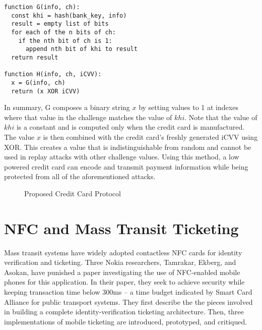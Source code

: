 \documentclass{sig-alternate}
\begin{document}
\begin{lstlisting}
function G(info, ch):
  const khi = hash(bank_key, info)
  result = empty list of bits
  for each of the n bits of ch:
    if the nth bit of ch is 1:
      append nth bit of khi to result
  return result

function H(info, ch, iCVV):
  x = G(info, ch)
  return (x XOR iCVV)
\end{lstlisting}

In summary, G composes a binary string $x$ by setting values to 1 at indexes where that value in the challenge matches the value of $khi$. Note that the value of $khi$ is a constant and is computed only when the credit card is manufactured. The value $x$ is then combined with the credit card's freshly generated iCVV using XOR. This creates a value that is indistinguishable from random and cannot be used in replay attacks with other challenge values. Using this method, a low powered credit card can encode and transmit payment information while being protected from all of the aforementioned attacks.

\begin{figure}
\centering
{}
\caption{Proposed Credit Card Protocol~\cite{CC2016}}
\label{fig:secureCC}
\end{figure}



\section{NFC and Mass Transit Ticketing}
\label{sec:mobile}

Mass transit systems have widely adopted contactless NFC cards for identity verification and ticketing. Three Nokia researchers, Tamrakar, Ekberg, and Asokan, have punished a paper investigating the use of NFC-enabled mobile phones for this application. In their paper, they seek to achieve security while keeping transaction time below 300ms -- a time budget indicated by Smart Card Alliance for public transport systems.
They first describe the the pieces involved in building a complete identity-verification ticketing architecture. Then, three implementations of mobile ticketing are introduced, prototyped, and critiqued.~\cite{Ticket2011}
\end{document}
